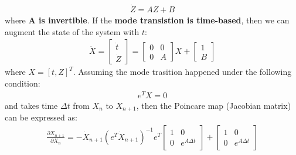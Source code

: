 \begin{align}
\dot Z = AZ +B
\end{align}
where \textbf{A is invertible}. If the \textbf{mode transistion  is time-based}, then we can augment the state of the system with $t$:
\begin{align}
\label{eq:AtEOM}
\dot X = 
\begin{bmatrix}
\dot t  \\
\dot Z
\end{bmatrix} = \begin{bmatrix}
0 & 0 \\
0 & A
\end{bmatrix}X + \begin{bmatrix}
1\\%
B 
\end{bmatrix}
\end{align}
where $X = [t,Z]^T$. Assuming the mode trasition happened under the following condition:
\begin{align}
e^T X = 0
\end{align}
and takes time $\Delta t$ from $X_n$ to $X_{n+1}$, then the Poincare map (Jacobian matrix) can be expressed as:
\begin{align}
\frac{\partial  X_{n+1}}{\partial  X_{n}} = -\dot X_{n+1}(e^T\dot X_{n+1})^{-1} e^T\begin{bmatrix}
1 & 0 \\
0 & e^{A\Delta t}
\end{bmatrix} + 
\begin{bmatrix}
1 & 0 \\
0 & e^{A\Delta t}
\end{bmatrix}
\end{align}

\pagebreak